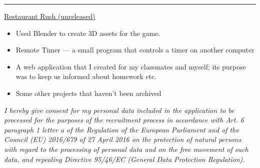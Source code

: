 \documentclass[10pt,a4paper,ragged2e,withhyper]{altacv}
\begin{document}
\begin{paracol}{2}




\bigskip

{\color{headingrule}\rule{\linewidth}{2pt}\par}

\bigskip

\small\href{https://github.com/Qarian/Restaurant-rush}{Restaurant Rush (unreleased)}
\smallskip

\begin{itemize}
    \item Used Blender to create 3D assets for the game.
\end{itemize}

\divider

\begin{itemize}
    \item Remote Timer — a small program that controls a timer on another computer
    \item A web application that I created for my classmates and myself; its purpose was to keep us informed about homework etc.
    \item Some other projects that haven’t been archived
\end{itemize}

\divider

\end{paracol}

\vspace{8pt}

\small\textit{I hereby give consent for my personal data included in the application to be processed for the purposes of the recruitment process in accordance with Art. 6 paragraph 1 letter a of the Regulation of the European Parliament and of the Council (EU) 2016/679 of 27 April 2016 on the protection of natural persons with regard to the processing of personal data and on the free movement of such data, and repealing Directive 95/46/EC (General Data Protection Regulation).}
\end{document}
